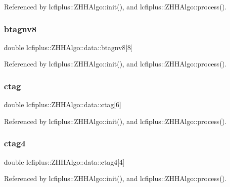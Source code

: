 Referenced by lcfiplus\+::\+Z\+H\+H\+Algo\+::init(), and lcfiplus\+::\+Z\+H\+H\+Algo\+::process().

\mbox{\label{structlcfiplus_1_1ZHHAlgo_1_1data_aa2aacc3e3093e2ac7ebdb0e9ac376b6e}} 
\subsubsection{btagnv8}
{\footnotesize\ttfamily double lcfiplus\+::\+Z\+H\+H\+Algo\+::data\+::btagnv8[8]}



Referenced by lcfiplus\+::\+Z\+H\+H\+Algo\+::init(), and lcfiplus\+::\+Z\+H\+H\+Algo\+::process().

\mbox{\label{structlcfiplus_1_1ZHHAlgo_1_1data_ab56cedc51492ed210f1978e6d10a4a45}} 
\subsubsection{ctag}
{\footnotesize\ttfamily double lcfiplus\+::\+Z\+H\+H\+Algo\+::data\+::ctag[6]}



Referenced by lcfiplus\+::\+Z\+H\+H\+Algo\+::init(), and lcfiplus\+::\+Z\+H\+H\+Algo\+::process().

\mbox{\label{structlcfiplus_1_1ZHHAlgo_1_1data_adbbf19603025e87ca98c5f84cac4491b}} 
\subsubsection{ctag4}
{\footnotesize\ttfamily double lcfiplus\+::\+Z\+H\+H\+Algo\+::data\+::ctag4[4]}



Referenced by lcfiplus\+::\+Z\+H\+H\+Algo\+::init(), and lcfiplus\+::\+Z\+H\+H\+Algo\+::process().

\mbox{\label{structlcfiplus_1_1ZHHAlgo_1_1data_ab83dc118dad1a9fa41e87855d5a697fd}} 
